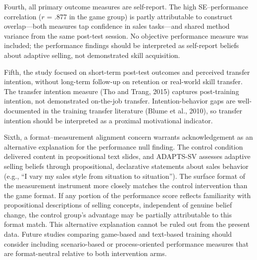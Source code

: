 \documentclass[12pt]{report}
\begin{document}
Fourth, all primary outcome measures are self-report. The high SE--performance correlation ($r$ = .877 in the game group) is partly attributable to construct overlap---both measures tap confidence in sales tasks---and shared method variance from the same post-test session. No objective performance measure was included; the performance findings should be interpreted as self-report beliefs about adaptive selling, not demonstrated skill acquisition.

Fifth, the study focused on short-term post-test outcomes and perceived transfer intention, without long-term follow-up on retention or real-world skill transfer. The transfer intention measure (Tho and Trang, 2015) captures post-training intention, not demonstrated on-the-job transfer. Intention-behavior gaps are well-documented in the training transfer literature (Blume et al., 2010), so transfer intention should be interpreted as a proximal motivational indicator.

Sixth, a format--measurement alignment concern warrants acknowledgement as an alternative explanation for the performance null finding. The control condition delivered content in propositional text slides, and ADAPTS-SV assesses adaptive selling beliefs through propositional, declarative statements about sales behavior (e.g., ``I vary my sales style from situation to situation''). The surface format of the measurement instrument more closely matches the control intervention than the game format. If any portion of the performance score reflects familiarity with propositional descriptions of selling concepts, independent of genuine belief change, the control group's advantage may be partially attributable to this format match. This alternative explanation cannot be ruled out from the present data. Future studies comparing game-based and text-based training should consider including scenario-based or process-oriented performance measures that are format-neutral relative to both intervention arms.
\end{document}
